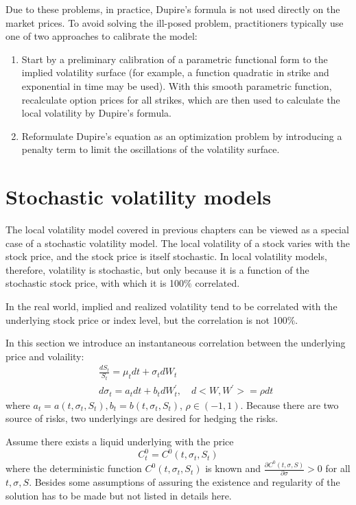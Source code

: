 \documentclass[10pt]{article}
\theoremstyle{plain}
\numberwithin{equation}{section}
\numberwithin{table}{section}
\newcommand{\s}{\sigma}
\newcommand{\pa}{\partial}
\begin{document}
Due to these problems, in practice, Dupire's formula is not used directly
on the market prices. To avoid solving the ill-posed problem, practitioners
typically use one of two approaches to calibrate the model:
\begin{enumerate}
    \item Start by a preliminary calibration of a parametric functional form to the
    implied volatility surface (for example, a function quadratic in strike and
    exponential in time may be used). With this smooth parametric function,
    recalculate option prices for all strikes, which are then used to calculate
    the local volatility by Dupire's formula.
    \item Reformulate Dupire's equation as an optimization problem by introducing
    a penalty term to limit the oscillations of the volatility surface.
\end{enumerate}



\newpage
\section{Stochastic volatility models}
The local volatility model covered in previous chapters can be viewed as
a special case of a stochastic volatility model. The local volatility of a stock
varies with the stock price, and the stock price is itself stochastic. In local
volatility models, therefore, volatility is stochastic, but only because it is a
function of the stochastic stock price, with which it is 100$\%$ correlated. 

In the real world, implied and realized volatility tend to be correlated with the
underlying stock price or index level, but the correlation is not 100$\%$.

In this section we introduce an instantaneous correlation between the underlying price 
and volaility: 
\begin{eqnarray}
    &&\frac{d S_t}{S_t} = \mu_t dt + \s_t dW_t   \nonumber \\
    &&d \s_t = a_t dt + b_t d W^{'}_t, \quad d<W, W^{'}>=\rho dt
    \label{stoch_vol_sde}
\end{eqnarray}
where $a_t=a(t, \s_t, S_t), b_t=b(t, \s_t, S_t)$, $\rho \in (-1, 1)$. Because there are two source of risks, two underlyings are desired for hedging the risks. 

Assume there exists a liquid underlying with the price
\[
    C_t^0=C^0(t, \s_t, S_t)    
\]
where the deterministic function $C^0(t, \s_t, S_t)$ is known and $\frac{\pa C^0(t, \s, S)}{\pa \s} > 0$ for all $t,\s, S$. Besides some assumptions of assuring the
existence and regularity of the solution has to be made but not listed in details here.
\end{document}
